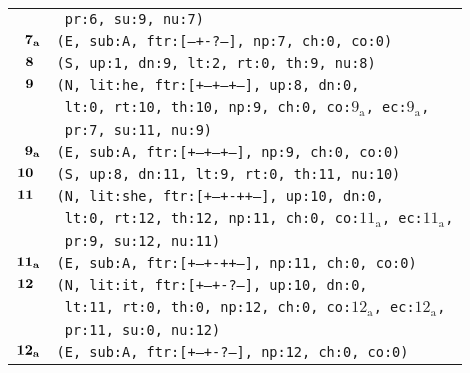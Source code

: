 \documentclass{article}
\begin{document}
\begin{minipage}{\textwidth}
{\begin{tabular}{|r|l|}
    & \texttt{\texttt{~pr:6,~su:9,~nu:7)}} \\
    ${\textbf{\textrm{7}}_{\textbf{\textrm{a}}}}$ & \texttt{\texttt{(E,~sub:A,~ftr:[---+-?---],~np:7,~ch:0,~co:0)}} \\
    ${\textbf{\textrm{8}}_{\phantom{z}}}$ & \texttt{\texttt{(S,~up:1,~dn:9,~lt:2,~rt:0,~th:9,~nu:8)}} \\
    ${\textbf{\textrm{9}}_{\phantom{z}}}$ & \texttt{\texttt{(N,~lit:he,~ftr:[+--+--+--],~up:8,~dn:0,}} \\
    & \texttt{\texttt{~lt:0,~rt:10,~th:10,~np:9,~ch:0,~co:${\textrm{9}_{\textrm{a}}}$,~ec:${\textrm{9}_{\textrm{a}}}$,}} \\
    & \texttt{\texttt{~pr:7,~su:11,~nu:9)}} \\
    ${\textbf{\textrm{9}}_{\textbf{\textrm{a}}}}$ & \texttt{\texttt{(E,~sub:A,~ftr:[+--+--+--],~np:9,~ch:0,~co:0)}} \\
    ${\textbf{\textrm{10}}_{\phantom{z}}}$ & \texttt{\texttt{(S,~up:8,~dn:11,~lt:9,~rt:0,~th:11,~nu:10)}} \\
    ${\textbf{\textrm{11}}_{\phantom{z}}}$ & \texttt{\texttt{(N,~lit:she,~ftr:[+--+-++--],~up:10,~dn:0,}} \\
    & \texttt{\texttt{~lt:0,~rt:12,~th:12,~np:11,~ch:0,~co:${\textrm{11}_{\textrm{a}}}$,~ec:${\textrm{11}_{\textrm{a}}}$,}} \\
    & \texttt{\texttt{~pr:9,~su:12,~nu:11)}} \\
    ${\textbf{\textrm{11}}_{\textbf{\textrm{a}}}}$ & \texttt{\texttt{(E,~sub:A,~ftr:[+--+-++--],~np:11,~ch:0,~co:0)}} \\
    ${\textbf{\textrm{12}}_{\phantom{z}}}$ & \texttt{\texttt{(N,~lit:it,~ftr:[+--+-?---],~up:10,~dn:0,}} \\
    & \texttt{\texttt{~lt:11,~rt:0,~th:0,~np:12,~ch:0,~co:${\textrm{12}_{\textrm{a}}}$,~ec:${\textrm{12}_{\textrm{a}}}$,}} \\
    & \texttt{\texttt{~pr:11,~su:0,~nu:12)}} \\
    ${\textbf{\textrm{12}}_{\textbf{\textrm{a}}}}$ & \texttt{\texttt{(E,~sub:A,~ftr:[+--+-?---],~np:12,~ch:0,~co:0)}} \\
    \hline
  \end{tabular}
  }
\end{minipage}
\bigbreak
\end{document}
